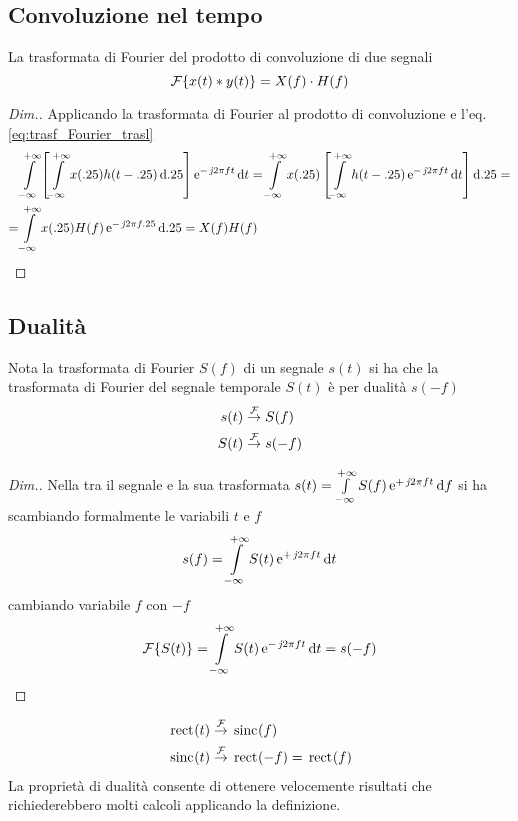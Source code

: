\subsection{Convoluzione nel tempo}
La trasformata di Fourier del prodotto di convoluzione di due segnali
\begin{equation}
\operatorname{\mathcal{F}}\!\left\lbrace{x(t)\ast y(t)}\right\rbrace=X(f)\cdot H(f)
\label{eq:trasf_Fourier_conv}
\end{equation}
\begin{proof}[Dim.] Applicando la trasformata di Fourier al prodotto di convoluzione e l'eq.\ref{eq:trasf_Fourier_trasl}
\[\begin{split}& \intinf{ \left[\intinf{x(\tau)h(t-\tau)}{\tau}\right] \e{-\imath 2\pi f t}}{t} = 
\intinf{ x(\tau) \left[\intinf{h(t-\tau)\e{-\imath 2\pi f t}}{t}\right]}{\tau}=\\
=& \intinf{ x(\tau) H(f)\e{-\imath 2\pi f \tau}}{\tau} = X(f) H(f) \end{split}\]
\end{proof}

\subsection{Dualità}
Nota la trasformata di Fourier $S(f)$ di un segnale $s(t)$ si ha che la trasformata di Fourier del segnale temporale $S(t)$ è per dualità $s(-f)$
\begin{equation}
\begin{split}
s(t) &\overset{\operatorname{\mathcal{F}}}{\to} S(f) \\
S(t) &\overset{\operatorname{\mathcal{F}}}{\to} s(-f)
\end{split}
\end{equation}
\begin{proof}[Dim.]
Nella tra il segnale e la sua trasformata $s(t)=\int\limits_{-\infty}^{+\infty}{S(f)\operatorname{e}^{+\operatorname{\mathit{j}\!} 2\pi f t}}{\,\mathop{}\!\mathrm{d}{f}}$
si ha scambiando formalmente le variabili $t$ e $f$ \[s(f)=\int\limits_{-\infty}^{+\infty}{S(t)\operatorname{e}^{+\operatorname{\mathit{j}\!} 2\pi f t}}{\,\mathop{}\!\mathrm{d}{t}}\]
cambiando variabile $f$ con $-f$
\[\operatorname{\mathcal{F}}\!\left\lbrace{S(t)}\right\rbrace=\int\limits_{-\infty}^{+\infty}{S(t)\operatorname{e}^{-\operatorname{\mathit{j}\!} 2\pi f t}}{\,\mathop{}\!\mathrm{d}{t}}=s(-f)\]
\end{proof}

\begin{esempio}
\begin{equation}
\begin{split}
\,{\operatorname{rect}}^{}\!\left({t}\right) &\overset{\operatorname{\mathcal{F}}}{\to} \,{\operatorname{sinc}}^{}\!\left({f}\right)\\
\,{\operatorname{sinc}}^{}\!\left({t}\right) &\overset{\operatorname{\mathcal{F}}}{\to} \,{\operatorname{rect}}^{}\!\left({-f}\right)=\,{\operatorname{rect}}^{}\!\left({f}\right)
\end{split}
\end{equation}
La proprietà di dualità consente di ottenere velocemente risultati che richiederebbero molti calcoli applicando la definizione.
\end{esempio}

